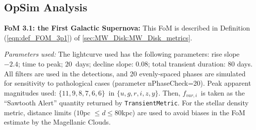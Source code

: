 

\subsection{OpSim Analysis}
\label{sec:\secname:MW_Disk_analysis}

{\bf FoM 3.1: the First Galactic Supernova:} This FoM is described in
Definition (\ref{eqn:def_FOM_3p1}) of
\autoref{sec:MW_Disk:MW_Disk_metrics}.

{\it Parameters used:} The lightcurve used has the following parameters:
rise slope $-2.4$; time to peak; $20$~days; decline slope: $0.08$; total
transient duration: 80 days. All filters are used in the detections, and
20 evenly-spaced phases are simulated for sensitivity to pathological
cases (parameter nPhaseCheck=20). Peak apparent magnitudes used: $\{
11,9,8,7,6,6\}$~in $\{u,g,r,i,z,y\}$. Then, $f_{var, i}$~is taken as the
``Sawtooth Alert'' quantity returned by {\tt TransientMetric}. For the
stellar density metric, distance limits ($10$pc $\le d \le 80$kpc) are
used to avoid biases in the FoM estimate by the Magellanic Clouds.

